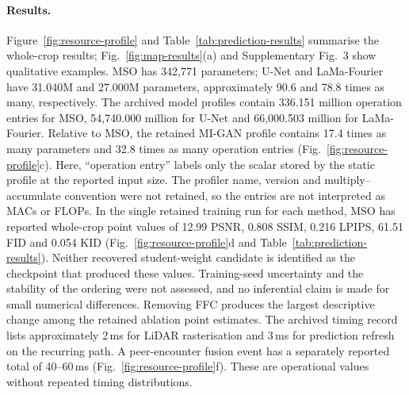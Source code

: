 \documentclass[11pt]{article}
\begin{document}
\paragraph{Results.} Figure~\ref{fig:resource-profile} and Table~\ref{tab:prediction-results} summarise the whole-crop results; Fig.~\ref{fig:map-results}(a) and Supplementary Fig.~3 show qualitative examples. MSO has 342{,}771 parameters; U-Net and LaMa-Fourier have 31.040M and 27.000M parameters, approximately 90.6 and 78.8 times as many, respectively. The archived model profiles contain 336.151 million operation entries for MSO, 54{,}740.000 million for U-Net and 66{,}000.503 million for LaMa-Fourier. Relative to MSO, the retained MI-GAN profile contains 17.4 times as many parameters and 32.8 times as many operation entries (Fig.~\ref{fig:resource-profile}c). Here, ``operation entry'' labels only the scalar stored by the static profile at the reported input size. The profiler name, version and multiply--accumulate convention were not retained, so the entries are not interpreted as MACs or FLOPs. In the single retained training run for each method, MSO has reported whole-crop point values of 12.99 PSNR, 0.808 SSIM, 0.216 LPIPS, 61.51 FID and 0.054 KID (Fig.~\ref{fig:resource-profile}d and Table~\ref{tab:prediction-results}). Neither recovered student-weight candidate is identified as the checkpoint that produced these values. Training-seed uncertainty and the stability of the ordering were not assessed, and no inferential claim is made for small numerical differences. Removing FFC produces the largest descriptive change among the retained ablation point estimates. The archived timing record lists approximately 2\,ms for LiDAR rasterisation and 3\,ms for prediction refresh on the recurring path. A peer-encounter fusion event has a separately reported total of 40--60\,ms (Fig.~\ref{fig:resource-profile}f). These are operational values without repeated timing distributions.
\end{document}

